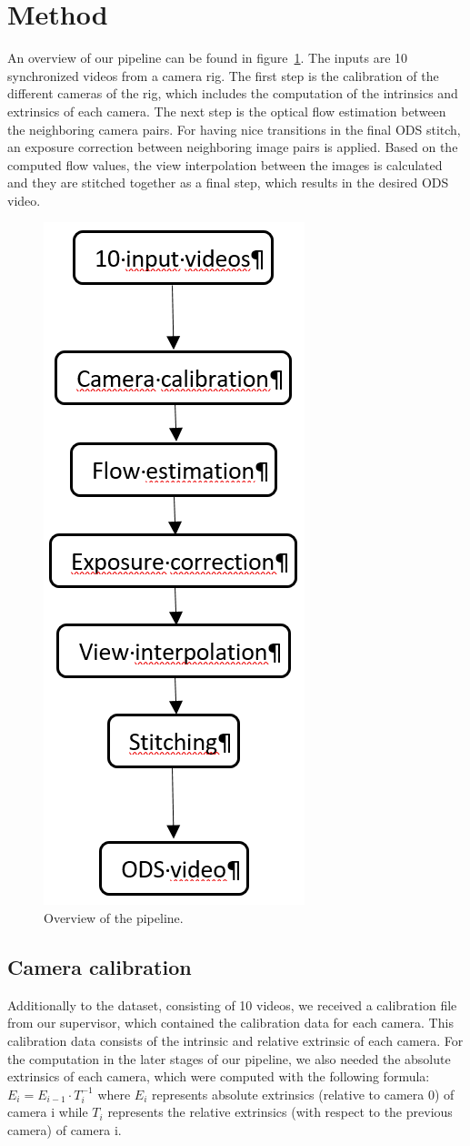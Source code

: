 \documentclass[10pt,twocolumn,letterpaper]{article}
\begin{document}
\section{Method}
\label{method}
An overview of our pipeline can be found in figure~\ref{pipeline}. The inputs are 10 synchronized videos from a camera rig. The first step is the calibration of the different cameras of the rig, which includes the computation of the intrinsics and extrinsics of each camera. The next step is the optical flow estimation between the neighboring camera pairs. For having nice transitions in the final ODS stitch, an exposure correction between neighboring image pairs is applied. Based on the computed flow values, the view interpolation between the images is calculated and they are stitched together as a final step, which results in the desired ODS video.

\begin{figure}[t]
\begin{center}
   \includegraphics[width=0.3\linewidth]{pictures/pipeline.PNG}
\end{center}
   \caption{Overview of the pipeline.}
\label{pipeline}
\end{figure}

\subsection{Camera calibration}
Additionally to the dataset, consisting of 10 videos, we received a calibration file from our supervisor, which contained the calibration data for each camera. This calibration data consists of the intrinsic and relative extrinsic of each camera. For the computation in the later stages of our pipeline, we also needed the absolute extrinsics of each camera, which were computed with the following formula:
$E_i= E_{i-1} \cdot T_i^{-1}$ where $E_i$ represents absolute extrinsics (relative to camera 0) of camera i while $T_i$ represents the relative extrinsics (with respect to the previous camera) of camera i.
\end{document}
